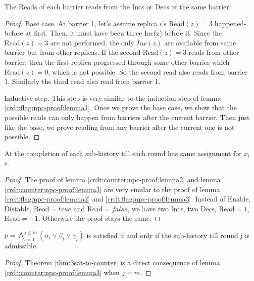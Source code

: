 \begin{lemma}
  \label{crdt:counter:npc-proof:lemma1}
  The \textrm{Read}s of each barrier reads from the \textrm{Inc}s or \textrm{Dec}s of the same barrier. 
\end{lemma}

\begin{proof}
  Base case. At barrier 1, let's assume replica $i$'s $\mathrm{Read}(z) = 3$ happened-before at first. Then, it must have been three Inc(z) before it. Since the $\mathrm{Read}(z) = 3$ are not performed, the only $Inc(z)$ are available from same barrier but from other replicas. If the second $\mathrm{Read}(z) = 3$ reads from other barrier, then the first replica progressed through some other barrier which $\mathrm{Read}(z) = 0$, which is not possible. So the second read also reads from barrier 1. Similarly the third read also read from barrier 1.

  Inductive step. This step is very similar to the induction step of lemma \ref{crdt:flag:npc-proof:lemma1}. Once we prove the base case, we show that the possible reads can only happen from barriers after the current barrier. Then just like the base, we prove reading from any barrier after the current one is not possible. 
\end{proof}

\begin{lemma}
  \label{crdt:counter:npc-proof:lemma2}
  At the completion of each sub-history till each round has same assignment for $x_i$s.
\end{lemma}

\begin{proof}
  The proof of lemma \ref{crdt:counter:npc-proof:lemma2} and lemma \ref{crdt:counter:npc-proof:lemma3} are very similar to the proof of lemma \ref{crdt:flag:npc-proof:lemma2} and \ref{crdt:flag:npc-proof:lemma3}. Instead of $\mathrm{Enable}$, $\mathrm{Distable}$, $\mathrm{Read}=true$ and $\mathrm{Read}=false$, we have two $\mathrm{Inc}$s, two $\mathrm{Dec}$s, $\mathrm{Read}=1$, $\mathrm{Read}=-1$. Otherwise the proof stays the same.
\end{proof}

\begin{lemma}
  \label{crdt:counter:npc-proof:lemma3}
  $p = \bigwedge_{i=1}^{j \leq m} (\alpha_i \lor \beta_i \lor \gamma_i)$ is satisfied if and only if the sub-history till round j is admissible.
\end{lemma}

\begin{proof}
  Theorem \ref{thm:3sat-to-counter} is a direct consequence of lemma \ref{crdt:counter:npc-proof:lemma3} when $j = m$.
\end{proof}
